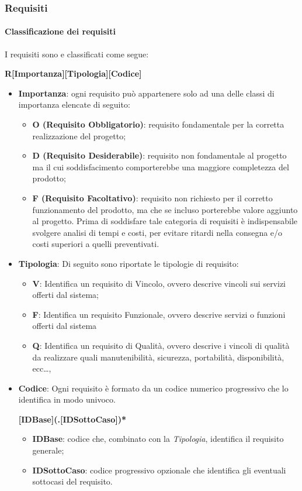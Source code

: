 \subsubsection{Requisiti}
\label{Requisiti}

\paragraph{Classificazione dei requisiti}\mbox{}
\label{Classificazione dei requisiti}

I requisiti sono e classificati come segue:
\begin{center}\textbf{R[Importanza][Tipologia][Codice]}\end{center}
\begin{itemize}
\item \textbf{Importanza}: ogni requisito può appartenere solo ad una delle classi di importanza elencate di seguito:
\begin{itemize}
\item \textbf{O (Requisito Obbligatorio)}: requisito fondamentale per la corretta realizzazione del progetto;
\item \textbf{D (Requisito Desiderabile)}: requisito non fondamentale al progetto ma il cui soddisfacimento comporterebbe una maggiore completezza del prodotto;
\item \textbf{F (Requisito Facoltativo)}: requisito non richiesto per il corretto funzionamento del prodotto, ma che se incluso porterebbe valore aggiunto al progetto. Prima di soddisfare tale categoria di requisiti \`e indispensabile svolgere analisi di tempi e costi, per evitare ritardi nella consegna e/o costi superiori a
quelli preventivati.
\end{itemize}
\item \textbf{Tipologia}: Di seguito sono riportate le tipologie di requisito:
\begin{itemize}
\item \textbf{V}: Identifica un requisito di Vincolo, ovvero descrive vincoli sui servizi offerti dal sistema; 
\item \textbf{F}: Identifica un requisito Funzionale, ovvero descrive servizi o funzioni offerti dal sistema
\item \textbf{Q}: Identifica un requisito di Qualit\`a, ovvero descrive i vincoli di qualità da realizzare quali manutenibilità, sicurezza, portabilità, disponibilità, ecc\dots,
\end{itemize}
\item \textbf{Codice}: Ogni requisito è formato da un codice numerico progressivo che lo identifica in modo univoco.
\noindent
\begin{center} \textbf{[IDBase](.[IDSottoCaso])*} \end{center}
\begin{itemize}
\item \textbf{IDBase}: codice che, combinato con la \textit{Tipologia}, identifica il requisito generale;
\item \textbf{IDSottoCaso}: codice progressivo opzionale che identifica gli eventuali sottocasi del requisito.
\end{itemize}
\end{itemize}
